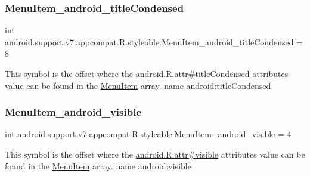 \subsubsection{\texorpdfstring{Menu\+Item\+\_\+android\+\_\+title\+Condensed}{MenuItem\_android\_titleCondensed}}
{\footnotesize\ttfamily int android.\+support.\+v7.\+appcompat.\+R.\+styleable.\+Menu\+Item\+\_\+android\+\_\+title\+Condensed = 8\hspace{0.3cm}{\ttfamily [static]}}

This symbol is the offset where the \hyperlink{}{android.\+R.\+attr\#title\+Condensed} attribute\textquotesingle{}s value can be found in the \hyperlink{classandroid_1_1support_1_1v7_1_1appcompat_1_1R_1_1styleable_a3161bf75811c963572105d304c98b088}{Menu\+Item} array.  name android\+:title\+Condensed \mbox{\label{classandroid_1_1support_1_1v7_1_1appcompat_1_1R_1_1styleable_aebbb1f4365cda37ee838c1def4ab0774}} 
\subsubsection{\texorpdfstring{Menu\+Item\+\_\+android\+\_\+visible}{MenuItem\_android\_visible}}
{\footnotesize\ttfamily int android.\+support.\+v7.\+appcompat.\+R.\+styleable.\+Menu\+Item\+\_\+android\+\_\+visible = 4\hspace{0.3cm}{\ttfamily [static]}}

This symbol is the offset where the \hyperlink{}{android.\+R.\+attr\#visible} attribute\textquotesingle{}s value can be found in the \hyperlink{classandroid_1_1support_1_1v7_1_1appcompat_1_1R_1_1styleable_a3161bf75811c963572105d304c98b088}{Menu\+Item} array.  name android\+:visible \mbox{\label{classandroid_1_1support_1_1v7_1_1appcompat_1_1R_1_1styleable_a1de0f110dc9609ff73b8af75f8d563ed}} 
